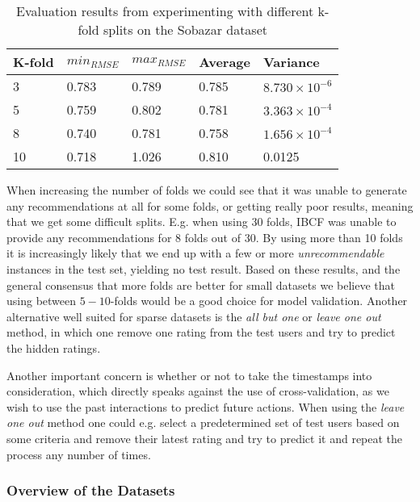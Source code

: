 \begin{table}[H]
\centering
\begin{tabular}{|l|l|l|l|l|}
\hline
K-fold & 	$min_{RMSE}$ 	&	$max_{RMSE}$ 	& Average 	& Variance 					\\ \hline
3	   & 	0.783 			& 	0.789 			& 0.785 	& $8.730 \times 10^{-6}$	\\ \hline
5	   & 	0.759			& 	0.802 			& 0.781 	& $3.363 \times 10^{-4}$ 	\\ \hline
8	   & 	0.740			& 	0.781			& 0.758 	& $1.656 \times 10^{-4}$ 	\\ \hline
10	   & 	0.718 			& 	1.026			& 0.810  	& 0.0125					\\ \hline
\end{tabular}
\caption{Evaluation results from experimenting with different k-fold splits on the Sobazar dataset}
\end{table}

When increasing the number of folds we could see that it was unable to generate any recommendations at all for some folds, or getting really poor results, meaning that we get some difficult splits. E.g. when using 30 folds, IBCF was unable to provide any recommendations for 8 folds out of 30. By using more than 10 folds it is increasingly likely that we end up with a few or more   \emph{unrecommendable} instances in the test set, yielding no test result. Based on these results, and the general consensus that more folds are better for small datasets we believe that using between $5-10$-folds would be a good choice for model validation. Another alternative well suited for sparse datasets is the \emph{all but one} or \emph{leave one out} method, in which one remove one rating from the test users and try to predict the hidden ratings.

Another important concern is whether or not to take the timestamps into consideration, which directly speaks against the use of cross-validation, as we wish to use the past interactions to predict future actions. When using the \emph{leave one out} method one could e.g. select a predetermined set of test users based on some criteria and remove their latest rating and try to predict it and repeat the process any number of times.


\subsubsection{Overview of the Datasets}

